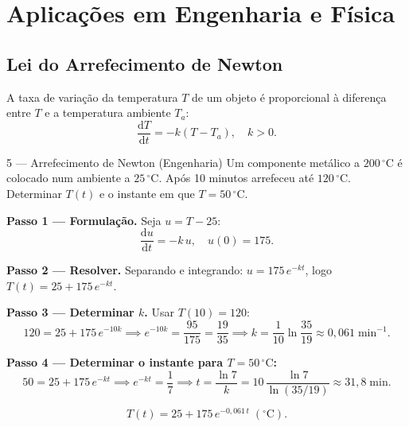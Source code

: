 \documentclass[12pt, a4paper]{article}
\newcommand{\dd}{\mathrm{d}}
\begin{document}
\section{Aplicações em Engenharia e Física}
\label{sec:applications}

\subsection{Lei do Arrefecimento de Newton}

\begin{tcolorbox}[
  colback=soft, colframe=primary,
  title={\textbf{Modelo Físico}},
  fonttitle=\bfseries\color{white},
  attach boxed title to top left={yshift=-2mm, xshift=4mm},
  boxed title style={colback=primary, rounded corners, size=small}
]
  A taxa de variação da temperatura $T$ de um objeto é proporcional à diferença
  entre $T$ e a temperatura ambiente $T_a$:
  \[
    \frac{\dd T}{\dd t} = -k(T - T_a), \quad k > 0.
  \]
\end{tcolorbox}

\begin{exbox}{5 --- Arrefecimento de Newton (Engenharia)}
  Um componente metálico a $200\,^{\circ}\mathrm{C}$ é colocado num ambiente a
  $25\,^{\circ}\mathrm{C}$. Após 10 minutos arrefeceu até $120\,^{\circ}\mathrm{C}$.
  Determinar $T(t)$ e o instante em que $T = 50\,^{\circ}\mathrm{C}$.
\end{exbox}

\begin{solbox}
  \textbf{Passo 1 --- Formulação.} Seja $u = T - 25$:
  \[
    \frac{\dd u}{\dd t} = -k\,u, \quad u(0)=175.
  \]

  \textbf{Passo 2 --- Resolver.} Separando e integrando:
  $u = 175\,e^{-kt}$, logo $T(t) = 25 + 175\,e^{-kt}$.

  \textbf{Passo 3 --- Determinar $k$.} Usar $T(10)=120$:
  \[
    120 = 25 + 175\,e^{-10k}
    \implies e^{-10k} = \frac{95}{175} = \frac{19}{35}
    \implies k = \frac{1}{10}\ln\!\frac{35}{19} \approx 0{,}061\;\mathrm{min}^{-1}.
  \]

  \textbf{Passo 4 --- Determinar o instante para $T=50\,^{\circ}\mathrm{C}$:}
  \[
    50 = 25 + 175\,e^{-kt}
    \implies e^{-kt} = \frac{1}{7}
    \implies t = \frac{\ln 7}{k}
               = 10\,\frac{\ln 7}{\ln(35/19)} \approx 31{,}8\;\mathrm{min}.
  \]

  \[
    \boxed{T(t) = 25 + 175\,e^{-0{,}061\,t}\;(^{\circ}\mathrm{C}).}
  \]
\end{solbox}
\end{document}

